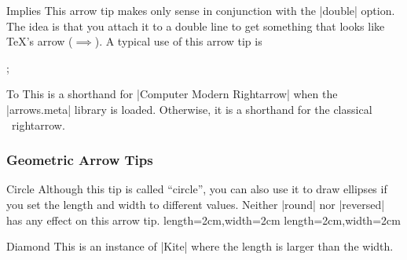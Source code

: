 \begin{arrowtipsimple}{Implies}
    This arrow tip makes only sense in conjunction with the |double| option.
    The idea is that you attach it to a double line to get something that looks
    like \TeX's \texttt{\string\implies} arrow ($\implies$). A typical use of
    this arrow tip is
\begin{codeexample}[preamble={\usetikzlibrary{arrows.meta,graphs}}]
\tikz {};
\end{codeexample}
    \begin{arrowexamples}
        \arrowexampledouble[]
        \arrowexampledouble[red]
    \end{arrowexamples}
\end{arrowtipsimple}

\begin{arrowtipsimple}{To}
    This is a shorthand for  |Computer Modern Rightarrow| when the |arrows.meta|
    library is loaded. Otherwise, it is a shorthand for the classical
    \tikzname\ rightarrow.
\end{arrowtipsimple}


\subsubsection{Geometric Arrow Tips}

\begin{arrowtip}{Circle}{
    Although this tip is called ``circle'', you can also use it to draw
    ellipses if you set the length and width to different values. Neither
    |round| nor |reversed| has any effect on this arrow tip.
}%
{length=2cm,width=2cm}%
{length=2cm,width=2cm}

    \begin{arrowexamples}
        \arrowexample[]
        \arrowexampledup[sep]
        \arrowexampledupdot[sep]
        \arrowexample[open]
        \arrowexample[length=3pt]
        \arrowexample[slant=.3]
        \arrowexample[left]
        \arrowexample[right]
        \arrowexample[red]
    \end{arrowexamples}
\end{arrowtip}

\begin{arrowtipsimple}{Diamond}
    This is an instance of |Kite| where the length is larger than the width.
    \begin{arrowexamples}
        \arrowexample[]
        \arrowexampledup[]
        \arrowexampledupdot[]
        \arrowexample[open]
        \arrowexample[length=10pt]
        \arrowexample[round]
        \arrowexample[slant=.3]
        \arrowexample[left]
        \arrowexample[right]
        \arrowexample[red]
        \arrowexample[fill=red!50]
    \end{arrowexamples}
\end{arrowtipsimple}

